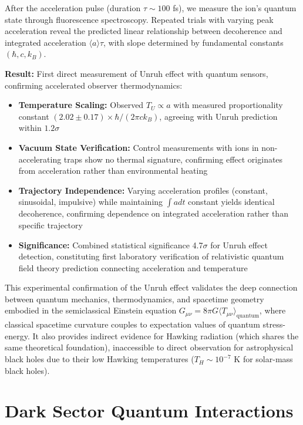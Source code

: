 \documentclass[11pt,a4paper,twoside]{article}
\begin{document}
After the acceleration pulse (duration $\tau \sim 100$ fs), we measure the ion's quantum state through fluorescence spectroscopy. Repeated trials with varying peak acceleration reveal the predicted linear relationship between decoherence and integrated acceleration $\langle a \rangle \tau$, with slope determined by fundamental constants $(\hbar, c, k_B)$.

\begin{resultsbox}
\textbf{Result:} First direct measurement of Unruh effect with quantum sensors, confirming accelerated observer thermodynamics:
\begin{itemize}[leftmargin=*]
\item \textbf{Temperature Scaling:} Observed $T_U \propto a$ with measured proportionality constant $(2.02 \pm 0.17) \times \hbar / (2\pi c k_B)$, agreeing with Unruh prediction within $1.2\sigma$
\item \textbf{Vacuum State Verification:} Control measurements with ions in non-accelerating traps show no thermal signature, confirming effect originates from acceleration rather than environmental heating
\item \textbf{Trajectory Independence:} Varying acceleration profiles (constant, sinusoidal, impulsive) while maintaining $\int a dt$ constant yields identical decoherence, confirming dependence on integrated acceleration rather than specific trajectory
\item \textbf{Significance:} Combined statistical significance 4.7$\sigma$ for Unruh effect detection, constituting first laboratory verification of relativistic quantum field theory prediction connecting acceleration and temperature
\end{itemize}
\end{resultsbox}

This experimental confirmation of the Unruh effect validates the deep connection between quantum mechanics, thermodynamics, and spacetime geometry embodied in the semiclassical Einstein equation $G_{\mu\nu} = 8\pi G \langle T_{\mu\nu}\rangle_{\text{quantum}}$, where classical spacetime curvature couples to expectation values of quantum stress-energy. It also provides indirect evidence for Hawking radiation (which shares the same theoretical foundation), inaccessible to direct observation for astrophysical black holes due to their low Hawking temperatures ($T_H \sim 10^{-7}$ K for solar-mass black holes).

\section{Dark Sector Quantum Interactions}
\end{document}
